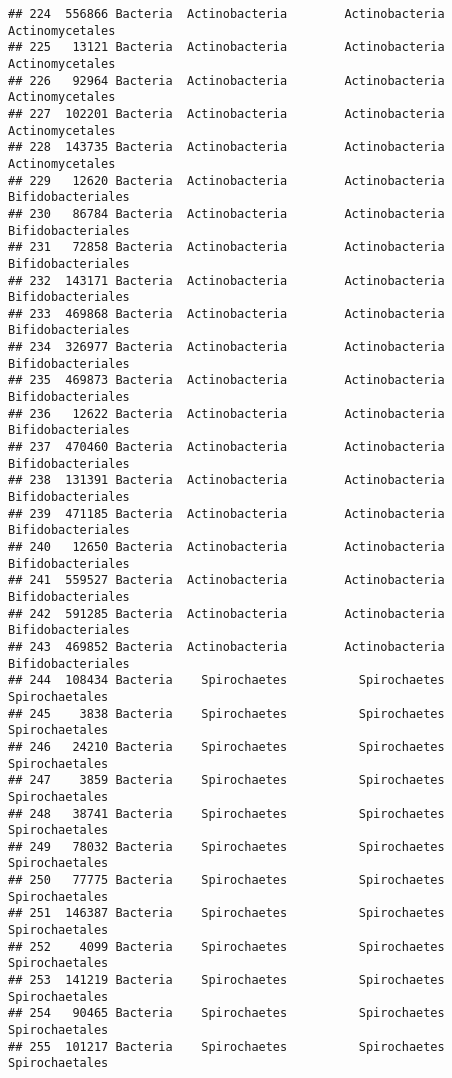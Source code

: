 \documentclass[
]{article}
\begin{document}
\begin{verbatim}
## 224  556866 Bacteria  Actinobacteria        Actinobacteria     Actinomycetales
## 225   13121 Bacteria  Actinobacteria        Actinobacteria     Actinomycetales
## 226   92964 Bacteria  Actinobacteria        Actinobacteria     Actinomycetales
## 227  102201 Bacteria  Actinobacteria        Actinobacteria     Actinomycetales
## 228  143735 Bacteria  Actinobacteria        Actinobacteria     Actinomycetales
## 229   12620 Bacteria  Actinobacteria        Actinobacteria   Bifidobacteriales
## 230   86784 Bacteria  Actinobacteria        Actinobacteria   Bifidobacteriales
## 231   72858 Bacteria  Actinobacteria        Actinobacteria   Bifidobacteriales
## 232  143171 Bacteria  Actinobacteria        Actinobacteria   Bifidobacteriales
## 233  469868 Bacteria  Actinobacteria        Actinobacteria   Bifidobacteriales
## 234  326977 Bacteria  Actinobacteria        Actinobacteria   Bifidobacteriales
## 235  469873 Bacteria  Actinobacteria        Actinobacteria   Bifidobacteriales
## 236   12622 Bacteria  Actinobacteria        Actinobacteria   Bifidobacteriales
## 237  470460 Bacteria  Actinobacteria        Actinobacteria   Bifidobacteriales
## 238  131391 Bacteria  Actinobacteria        Actinobacteria   Bifidobacteriales
## 239  471185 Bacteria  Actinobacteria        Actinobacteria   Bifidobacteriales
## 240   12650 Bacteria  Actinobacteria        Actinobacteria   Bifidobacteriales
## 241  559527 Bacteria  Actinobacteria        Actinobacteria   Bifidobacteriales
## 242  591285 Bacteria  Actinobacteria        Actinobacteria   Bifidobacteriales
## 243  469852 Bacteria  Actinobacteria        Actinobacteria   Bifidobacteriales
## 244  108434 Bacteria    Spirochaetes          Spirochaetes      Spirochaetales
## 245    3838 Bacteria    Spirochaetes          Spirochaetes      Spirochaetales
## 246   24210 Bacteria    Spirochaetes          Spirochaetes      Spirochaetales
## 247    3859 Bacteria    Spirochaetes          Spirochaetes      Spirochaetales
## 248   38741 Bacteria    Spirochaetes          Spirochaetes      Spirochaetales
## 249   78032 Bacteria    Spirochaetes          Spirochaetes      Spirochaetales
## 250   77775 Bacteria    Spirochaetes          Spirochaetes      Spirochaetales
## 251  146387 Bacteria    Spirochaetes          Spirochaetes      Spirochaetales
## 252    4099 Bacteria    Spirochaetes          Spirochaetes      Spirochaetales
## 253  141219 Bacteria    Spirochaetes          Spirochaetes      Spirochaetales
## 254   90465 Bacteria    Spirochaetes          Spirochaetes      Spirochaetales
## 255  101217 Bacteria    Spirochaetes          Spirochaetes      Spirochaetales

\end{verbatim}
\end{document}
